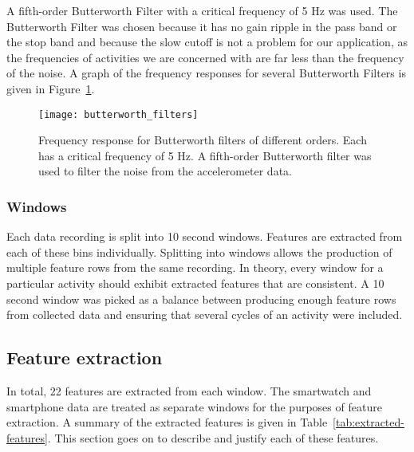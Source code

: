         A fifth-order Butterworth Filter with a critical frequency of 5 \si{Hz} was used. The Butterworth Filter was chosen because it has no gain ripple in the pass band or the stop band and because the slow cutoff is not a problem for our application, as the frequencies of activities we are concerned with are far less than the frequency of the noise. A graph of the frequency responses for several Butterworth Filters is given in Figure~\ref{fig:butterworth_filters}.
        
        \begin{figure}
          \centering
          \texttt{[image: butterworth\_filters]}
          \caption{Frequency response for Butterworth filters of different orders. Each has a critical frequency of 5 \si{Hz}. A fifth-order Butterworth filter was used to filter the noise from the accelerometer data.}
          \label{fig:butterworth_filters}
        \end{figure}
        
      \subsubsection{Windows}
        Each data recording is split into 10 second windows. Features are extracted from each of these bins individually. Splitting into windows allows the production of multiple feature rows from the same recording. In theory, every window for a particular activity should exhibit extracted features that are consistent. A 10 second window was picked as a balance between producing enough feature rows from collected data and ensuring that several cycles of an activity were included. 
      
    \subsection{Feature extraction}
      \label{sec:feature-extraction}
      In total, 22 features are extracted from each window. The smartwatch and smartphone data are treated as separate windows for the purposes of feature extraction. A summary of the extracted features is given in Table~\ref{tab:extracted-features}. This section goes on to describe and justify each of these features.
      
